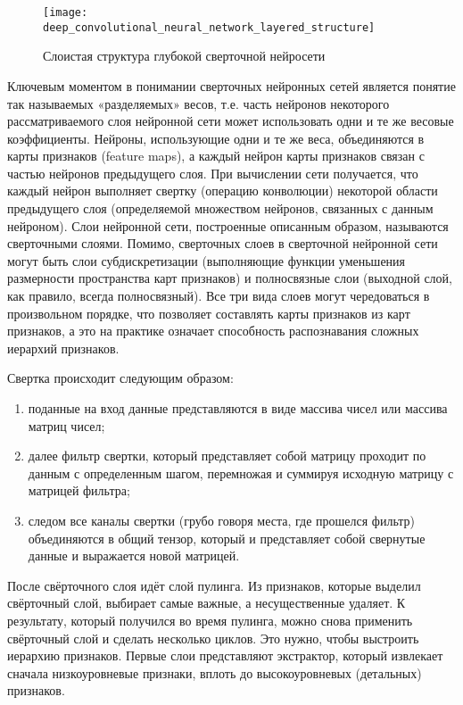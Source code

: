    \begin{figure}[ht]
        \centering
        \texttt{[image: deep\_convolutional\_neural\_network\_layered\_structure]}
        \caption{Слоистая структура глубокой сверточной нейросети}
        \label{fig:deep_convolutional_neural_network_layered_structure}
    \end{figure}

    Ключевым моментом в понимании сверточных нейронных сетей является понятие так называемых «разделяемых» весов, т.е. часть нейронов некоторого рассматриваемого слоя нейронной сети может использовать одни и те же весовые коэффициенты. Нейроны, использующие одни и те же веса, объединяются в карты признаков (feature maps), а каждый нейрон карты признаков связан с частью нейронов предыдущего слоя. При вычислении сети получается, что каждый нейрон выполняет свертку (операцию конволюции) некоторой области предыдущего слоя (определяемой множеством нейронов, связанных с данным нейроном). Слои нейронной сети, построенные описанным образом, называются сверточными слоями. Помимо, сверточных слоев в сверточной нейронной сети могут быть слои субдискретизации (выполняющие функции уменьшения размерности пространства карт признаков) и полносвязные слои (выходной слой, как правило, всегда полносвязный). Все три вида слоев могут чередоваться в произвольном порядке, что позволяет составлять карты признаков из карт признаков, а это на практике означает способность распознавания сложных иерархий признаков.

    Свертка происходит следующим образом:
    \begin{enumerate}
        \item поданные на вход данные представляются в виде массива чисел или массива матриц чисел;
        \item далее фильтр свертки, который представляет собой матрицу проходит по данным с определенным шагом, перемножая и суммируя исходную матрицу с матрицей фильтра;
        \item следом все каналы свертки (грубо говоря места, где прошелся фильтр) объединяются в общий тензор, который и представляет собой свернутые данные и выражается новой матрицей.
    \end{enumerate}
    
    После свёрточного слоя идёт слой пулинга. Из признаков, которые выделил свёрточный слой, выбирает самые важные, а несущественные удаляет. К результату, который получился во время пулинга, можно снова применить свёрточный слой и сделать несколько циклов. Это нужно, чтобы выстроить иерархию признаков. Первые слои представляют экстрактор, который извлекает сначала низкоуровневые признаки, вплоть до высокоуровневых (детальных) признаков.
    
